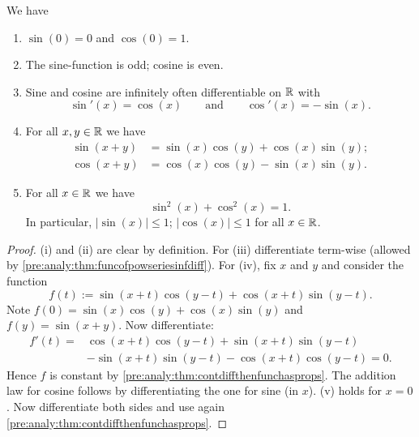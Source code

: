 \documentclass[10pt, a4paper]{article}
\begin{document}
\begin{theorem}
    We have
    \begin{enumerate}[label = (\roman*)]
        \item $\sin(0) = 0$ and $\cos(0) = 1$.
        
        \item The sine-function is odd;
        cosine is even.
        
        \item Sine and cosine are infinitely often differentiable on $\mathbb{R}$ with
        \[
        \sin'(x) = \cos(x)\qquad\text{and}\qquad\cos'(x) = -\sin(x).
        \]

        \item For all $x, y \in \mathbb{R}$ we have
        \begin{align*}
            \sin(x + y) &= \sin(x)\cos(y) + \cos(x)\sin(y); \\
            \cos(x + y) &= \cos(x)\cos(y) - \sin(x)\sin(y).
        \end{align*}

        \item For all $x \in \mathbb{R}$ we have
        \[
        \sin ^ 2(x) + \cos ^ 2(x) = 1.
        \]
        In particular,
        $|\sin(x)| \leq 1$;
        $|\cos(x)| \leq 1$ for all $x \in \mathbb{R}$.
    \end{enumerate}
    \begin{proof}
        (i) and (ii) are clear by definition.
        For (iii) differentiate term-wise
        (allowed by \autoref{pre:analy:thm:funcofpowseriesinfdiff}).
        For (iv),
        fix $x$ and $y$ and consider the function
        \[
        f(t) := \sin(x + t)\cos(y - t) + \cos(x + t)\sin(y - t).
        \]
        Note $f(0) = \sin(x)\cos(y) + \cos(x)\sin(y)$ and $f(y) = \sin(x + y)$.
        Now differentiate:
        \begin{align*}
            f'(t) = &\cos(x + t)\cos(y - t) + \sin(x + t)\sin(y - t) \\
            &-\sin(x + t)\sin(y - t) - \cos(x + t)\cos(y - t) = 0.
        \end{align*}
        Hence $f$ is constant by \autoref{pre:analy:thm:contdiffthenfunchasprops}.
        The addition law for cosine follows by differentiating the one for sine
        (in $x$).
        (v) holds for $x = 0$.
        Now differentiate both sides and use again \autoref{pre:analy:thm:contdiffthenfunchasprops}.
    \end{proof}
\end{theorem}
\end{document}
